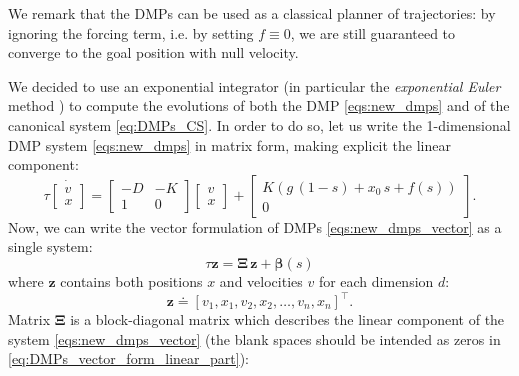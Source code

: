 \documentclass[fleqn, 11pt]{article}
\theoremstyle{definition}
\theoremstyle{plain}
\theoremstyle{remark}
\begin{document}
We remark that the DMPs can be used as a classical planner of trajectories: by ignoring the forcing term, i.e. by setting $f \equiv 0$, we are still guaranteed to converge to the goal position with null velocity.

We decided to use an exponential integrator (in particular the \emph{exponential Euler} method \cite{CO09}) to compute the evolutions of both the DMP \eqref{eqs:new_dmps} and of the canonical system \eqref{eq:DMPs_CS}.
In order to do so, let us write the 1-dimensional DMP system \eqref{eqs:new_dmps} in matrix form, making explicit the linear component:
\begin{equation}
    \label{eq:new_DMP_matrix_form_single}
    \tau \dot{
        \begin{bmatrix}
            v \\ x
        \end{bmatrix}} = 
        \begin{bmatrix}
            - D & - K \\
            1   & 0
        \end{bmatrix}
        \begin{bmatrix}
            v \\ x
        \end{bmatrix}
        +
        \begin{bmatrix}
            K (g \, (1 - s) + x_0 \, s + f(s)) \\
            0
        \end{bmatrix}.
\end{equation}
Now, we can write the vector formulation of DMPs \eqref{eqs:new_dmps_vector} as a single system:
\begin{equation}
    \label{eq:DMPs_vector_form}
    \tau {\mathbf{z}} = \bm{\Xi} \, \mathbf{z} + \bm{\beta}(s)
\end{equation}
where $\mathbf{z}$ contains both positions $x$ and velocities $v$ for each dimension $d$:
\begin{equation}
    \mathbf{z} \doteq
    [    v_1 , x_1 , v_2 , x_2 , \ldots , v_n , x_n ] ^\intercal .
\end{equation}
Matrix $\mathbf{\Xi}$ is a block-diagonal matrix which describes the linear component of the system \eqref{eqs:new_dmps_vector} (the blank spaces should be intended as zeros in \eqref{eq:DMPs_vector_form_linear_part}):
\end{document}

